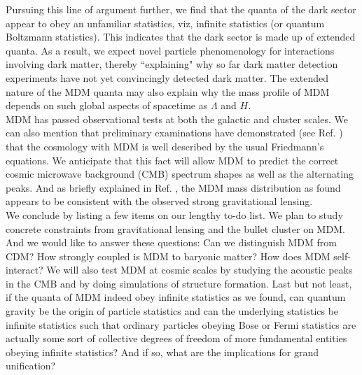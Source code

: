\documentclass[a4paper]{jpconf}
\begin{document}
Pursuing this line of argument further, we find that the
quanta of the dark sector appear to obey an unfamiliar
statistics, viz, infinite statistics (or quantum
Boltzmann statistics).  This indicates that 
the dark sector is made up of extended quanta.  As a result,
we expect novel particle phenomenology for interactions 
involving dark matter, thereby ``explaining" why so far 
dark matter detection experiments have not yet convincingly
detected dark matter.  The extended nature of the MDM quanta 
may also explain why the mass profile of MDM depends
on such global aspects of spacetime as $\Lambda$ and $H$.\\


MDM has passed observational tests at both the galactic and cluster 
scales.  We can also mention that
preliminary examinations have
demonstrated (see Ref. \cite{HMN})  
that the cosmology with MDM is well described by the usual 
Friedmann's equations.  We anticipate that this fact 
will allow MDM to predict the correct cosmic microwave 
background (CMB) spectrum shapes as well as the alternating peaks.
And as briefly explained in Ref. \cite{ng16a}, the MDM mass 
distribution as found appears to be consistent with the observed
strong gravitational lensing.\\

We conclude by listing a few items on our lengthy to-do list. 
We plan to study 
concrete constraints from gravitational lensing 
and the bullet cluster on MDM. And 
we would like to answer these questions: 
Can we distinguish MDM from CDM? How strongly
coupled is MDM to baryonic matter?  How does MDM self-interact? We will 
also test MDM at 
cosmic scales by studying the acoustic peaks in the CMB and by doing
simulations of structure formation. 
Last but not least, if the quanta of MDM indeed obey infinite statistics
as we found, can quantum gravity
be the origin of particle statistics and can the underlying 
statistics be infinite statistics such that ordinary particles
obeying Bose or Fermi statistics are actually some sort of 
collective degrees of freedom of more fundamental entities 
obeying infinite statistics?  And if so, what 
are the implications for grand unification?
  
\end{document}
